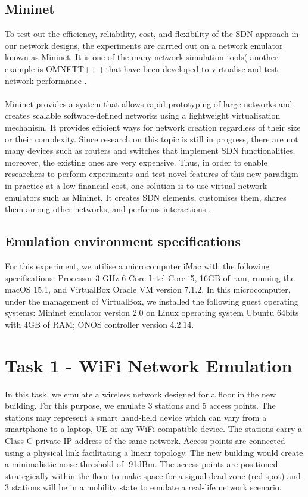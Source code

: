 \documentclass{article}
\begin{document}
\subsection{Mininet}
To test out the efficiency, reliability, cost, and flexibility of the SDN approach in our network designs, the experiments are carried out on a network emulator known as Mininet. It is one of the many network simulation tools( another example is OMNETT++ ) that have been developed to virtualise and test network performance \citep{10220519, Haji_Zeebaree_Saeed_Ameen_Shukur_Omar_Sadeeq_Ageed_Ibrahim_Yasin_2021}. \\\\ Mininet \citep{6860404} provides a system that allows rapid prototyping of large networks and creates scalable software-defined networks using a lightweight virtualisation mechanism. It provides efficient ways for network creation regardless of their size or their complexity. Since research on this topic is still in progress, there are not many devices such as routers and switches that implement SDN functionalities, moreover, the existing ones are very expensive. Thus, in order to enable researchers to perform experiments and test novel features of this new paradigm in practice at a low financial cost, one solution is to use virtual network emulators such as Mininet. It creates SDN elements, customises them, shares them among other networks, and performs interactions \citep{6860404}.
\subsection{Emulation environment specifications}
For this experiment, we utilise a microcomputer iMac with the following specifications: Processor 3 GHz 6-Core Intel Core i5, 16GB of ram, running the macOS 15.1, and VirtualBox Oracle VM version 7.1.2.
In this microcomputer, under the management of VirtualBox, we installed the following guest operating systems: Mininet emulator version 2.0 on Linux operating system Ubuntu 64bits with 4GB of RAM; ONOS controller version 4.2.14.

\newpage
\section{Task 1 - WiFi Network Emulation}
In this task, we emulate a wireless network designed for a floor in the new building. For this purpose, we emulate 3 stations and 5 access points. The stations may represent a smart hand-held device which can vary from a smartphone to a laptop, UE or any WiFi-compatible device. The stations carry a Class C private IP address of the same network. Access points are connected using a physical link facilitating a linear topology. The new building would create a minimalistic noise threshold of -91dBm. The access points are positioned strategically within the floor to make space for a signal dead zone (red spot) and 3 stations will be in a mobility state to emulate a real-life network scenario. 
\end{document}
